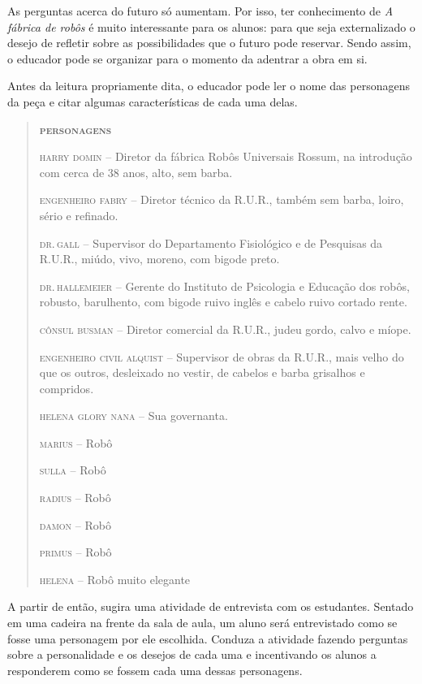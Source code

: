 \documentclass[11pt]{extarticle}
\begin{document}
As perguntas acerca do futuro só aumentam. Por isso, ter conhecimento de \textit{A fábrica de robôs} é muito interessante para os alunos: para que seja externalizado o desejo de refletir sobre as possibilidades que o futuro pode reservar. Sendo assim, o educador pode se organizar para o momento da adentrar a obra em si.


Antes da leitura propriamente dita, o educador pode ler o nome das personagens da peça e citar algumas características de cada uma delas.


\begin{quotation}
\textsc{\textbf{personagens}} 

\textsc{harry domin} 		--  Diretor da fábrica Robôs Universais Rossum, na introdução com cerca de 38 anos, alto, sem barba.

\textsc{engenheiro fabry} 	--  Diretor técnico da R.U.R., também sem barba, loiro, sério e refinado. 

\textsc{dr.\,gall} 		--  Supervisor do Departamento Fisiológico e de Pesquisas da R.U.R., miúdo, vivo, moreno, com bigode preto.

\textsc{dr.\,hallemeier} 	-- Gerente do Instituto de Psicologia e Educação dos robôs, robusto, barulhento, com bigode ruivo inglês e cabelo ruivo cortado rente. 

\textsc{cônsul busman} 		--  Diretor comercial da R.U.R., judeu gordo, calvo e míope. 

\textsc{engenheiro civil alquist} --  Supervisor de obras da R.U.R., mais velho do que os outros, desleixado no vestir, de cabelos e barba grisalhos e compridos. 

\textsc{helena} \textsc{glory} 
\textsc{nana} 				-- Sua governanta. 

\textsc{marius} 			-- Robô

\textsc{sulla} 				-- Robô

\textsc{radius} 			-- Robô

\textsc{damon} 				-- Robô

\textsc{primus} 			-- Robô

\textsc{helena} 			-- Robô muito elegante
\end{quotation}

A partir de então, sugira uma atividade de entrevista com os estudantes. Sentado em uma cadeira na frente da sala de aula, um aluno será entrevistado como se fosse uma personagem por ele escolhida. Conduza a atividade fazendo perguntas sobre a personalidade e os desejos de cada uma e incentivando os alunos a responderem como se fossem cada uma dessas personagens.
\end{document}
